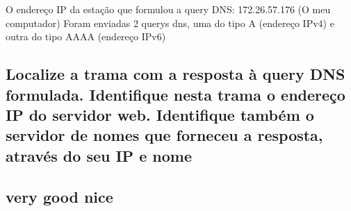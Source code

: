 \documentclass{article}
\begin{document}
O endereço IP da estação que formulou a query DNS: 172.26.57.176 (O meu computador)
Foram enviadas 2 querys dns, uma do tipo A (endereço IPv4) e outra do tipo AAAA (endereço IPv6)

\subsection{Localize a trama com a resposta à query DNS formulada. Identifique nesta trama o endereço IP do
servidor web. Identifique também o servidor de nomes que forneceu a resposta, através do seu IP e nome}

\subsection{very good nice}


\end{document}
